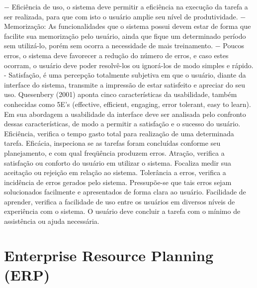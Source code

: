 \indent − Eficiência de uso, o sistema deve permitir a eficiência na execução da tarefa a ser realizada, para que com isto o usuário amplie seu nível de produtividade. 
− Memorização: As funcionalidades que o sistema possui devem estar de forma que facilite sua memorização pelo usuário, ainda que fique um determinado período sem utilizá-lo, porém sem ocorra a necessidade de mais treinamento. \newline
\indent − Poucos erros, o sistema deve favorecer a redução do número de erros, e caso estes ocorram, o usuário deve poder resolvê-los ou ignorá-los de modo simples e rápido.\newline
\indent - Satisfação, é uma percepção totalmente subjetiva em que o usuário, diante da interface do sistema, transmite a impressão de estar satisfeito e apreciar do seu uso.\newline
\indent Quesenbery (2001) aponta cinco características da usabilidade, também conhecidas como 5E’s (effective, efficient, engaging, error tolerant, easy to learn). Em sua abordagem a usabilidade da interface deve ser analisada pelo confronto dessas características, de modo a permitir a satisfação e o sucesso do usuário. \newline
\indent Eficiência, verifica o tempo gasto total para realização de uma determinada tarefa. \newline
\indent Eficácia, inspeciona se as tarefas foram concluídas conforme seu planejamento, e com qual freqüência produzem erros. \newline
\indent Atração, verifica a satisfação ou conforto do usuário em utilizar o sistema. Focaliza medir sua aceitação ou rejeição em relação ao sistema. \newline
\indent Tolerância a erros, verifica a incidência de erros gerados pelo sistema. Pressupõe-se que tais erros sejam solucionados facilmente e apresentados de forma clara ao usuário.\newline
\indent Facilidade de aprender, verifica a facilidade de uso entre os usuários em diversos níveis de experiência com o sistema. O usuário deve concluir a tarefa com o mínimo de assistência ou ajuda necessária.

\section{Enterprise Resource Planning (ERP)}  \label{Enterprise Resource Planning (ERP)}

